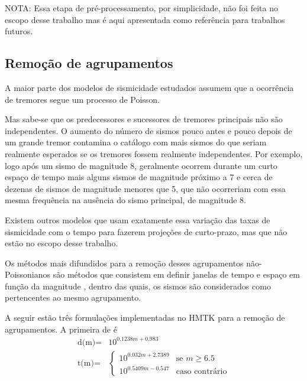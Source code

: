NOTA: Essa etapa de pré-processamento, por simplicidade, não foi feita no escopo desse trabalho mas é aqui apresentada 
como referência para trabalhos futuros.


\subsection{Remoção de agrupamentos}
\label{sec:declustering}

A maior parte dos modelos de sismicidade estudados assumem que a ocorrência de
tremores segue um processo de Poisson.

Mas sabe-se que os predecessores e sucessores de tremores principais não são independentes.
O aumento do número de sismos pouco antes e pouco depois de um grande tremor contamina
o catálogo com mais sismos do que seriam realmente esperados se os tremores fossem realmente independentes.
Por exemplo, logo após um sismo de magnitude 8, geralmente ocorrem durante um curto 
espaço de tempo mais alguns sismos de magnitude próximo a 7 e cerca de dezenas de sismos 
de magnitude menores que 5, que não ocorreriam com essa mesma frequência na ausência do sismo
principal, de magnitude 8.

Existem outros modelos que usam exatamente essa variação das taxas de sismicidade com o tempo
para fazerem projeções de curto-prazo, mas que não estão no escopo desse trabalho.

Os métodos mais difundidos para a remoção desses agrupamentos não-Poissonianos são métodos que consistem em definir
janelas de tempo e espaço em função da magnitude \citep{gardner_1974}, dentro das quais, os sismos são considerados como pertencentes ao mesmo
agrupamento. 

A seguir estão três formulações implementadas no HMTK para a remoção de agrupamentos.
A primeira de \citet{gardner_1974} é 
\begin{equation}\begin{split} 
\mbox{d(m)} = &10^{0.1238 m + 0.983}\\
\mbox{t(m)} = & 
\begin{cases} 10^{0.032 m + 2.7389} & \text{se $m \geq 6.5$} \\ 
              10^{0.5409 m - 0.547} & \mbox{caso contrário}  \end{cases}\end{split}
\end{equation}

